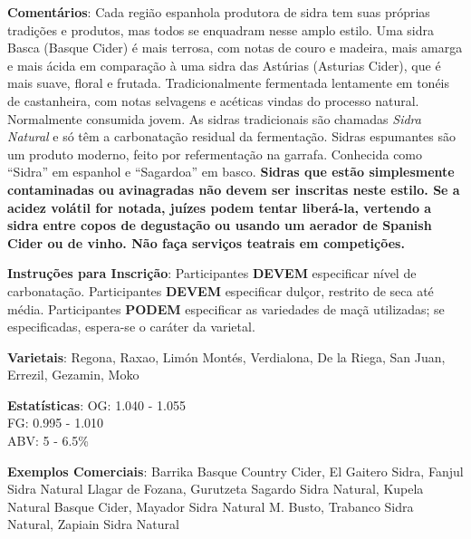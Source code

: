 \textbf{Comentários}: Cada região espanhola produtora de sidra tem suas próprias tradições e produtos, mas todos se enquadram nesse amplo estilo. Uma sidra Basca (Basque Cider) é mais terrosa, com notas de couro e madeira, mais amarga e mais ácida em comparação à uma sidra das Astúrias (Asturias Cider), que é mais suave, floral e frutada. Tradicionalmente fermentada lentamente em tonéis de castanheira, com notas selvagens e acéticas vindas do processo natural. Normalmente consumida jovem. As sidras tradicionais são chamadas \textit{Sidra Natural} e só têm a carbonatação residual da fermentação. Sidras espumantes são um produto moderno, feito por refermentação na garrafa. Conhecida como “Sidra” em espanhol e “Sagardoa” em basco. \textbf{Sidras que estão simplesmente contaminadas ou avinagradas não devem ser inscritas neste estilo. Se a acidez volátil for notada, juízes podem tentar liberá-la, vertendo a sidra entre copos de degustação ou usando um aerador de Spanish Cider ou de vinho. Não faça serviços teatrais em competições.}

\textbf{Instruções para Inscrição}: Participantes \textbf{DEVEM} especificar nível de carbonatação. Participantes \textbf{DEVEM} especificar dulçor, restrito de seca até média. Participantes \textbf{PODEM} especificar as variedades de maçã utilizadas; se especificadas, espera-se o caráter da varietal.

\textbf{Varietais}: Regona, Raxao, Limón Montés, Verdialona, De la Riega, San Juan, Errezil, Gezamin, Moko

\textbf{Estatísticas}: OG: 1.040 - 1.055 \\
\phantom{ } \hspace{16.5mm} FG: 0.995 - 1.010 \\
\phantom{ } \hspace{16.5mm} ABV: 5 - 6.5\%

\textbf{Exemplos Comerciais}: Barrika Basque Country Cider, El Gaitero Sidra, Fanjul Sidra Natural Llagar de Fozana, Gurutzeta Sagardo Sidra Natural, Kupela Natural Basque Cider, Mayador Sidra Natural M. Busto, Trabanco Sidra Natural, Zapiain Sidra Natural
